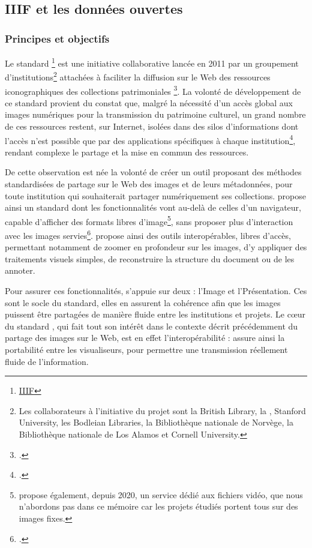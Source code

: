 
\subsection{IIIF et les données ouvertes}
    \subsubsection{Principes et objectifs}
Le standard \iiif\footnote{\href{https://iiif.io/}{IIIF}} est une initiative collaborative lancée en 2011 par un groupement d'institutions\footnote{Les collaborateurs à l'initiative du projet sont la British Library, la \bnf, Stanford University, les Bodleian Libraries, la Bibliothèque nationale de Norvège, la Bibliothèque nationale de Los Alamos et Cornell University.} attachées à faciliter la diffusion sur le Web des ressources iconographiques des collections patrimoniales \footcite{cramerInternationalImageInteroperability2011}. La volonté de développement de ce standard provient du constat que, malgré la nécessité d'un accès global aux images numériques pour la transmission du patrimoine culturel, un grand nombre de ces ressources restent, sur Internet, isolées dans des silos d'informations dont l'accès n'est possible que par des applications spécifiques à chaque institution\footcite{cramerInternationalImageInteroperability2011}, rendant complexe le partage et la mise en commun des ressources.

De cette observation est née la volonté de créer un outil proposant des méthodes standardisées de partage sur le Web des images et de leurs métadonnées, pour toute institution qui souhaiterait partager numériquement ses collections. \iiif propose ainsi un standard dont les fonctionnalités vont au-delà de celles d'un navigateur, capable d'afficher des formats libres d'image\footnote{\iiif propose également, depuis 2020, un service dédié aux fichiers vidéo, que nous n'abordons pas dans ce mémoire car les projets étudiés portent tous sur des images fixes.}, sans proposer plus d'interaction avec les images servies\footcite{HowItWorks}. \iiif propose ainsi des outils interopérables, libres d'accès, permettant notamment de zoomer en profondeur sur les images, d'y appliquer des traitements visuels simples, de reconstruire la structure du document ou de les annoter.

Pour assurer ces fonctionnalités, \iiif s'appuie sur deux \api : l'\api Image et l'\api Présentation. Ces \api sont le socle du standard, elles en assurent la cohérence afin que les images puissent être partagées de manière fluide entre les institutions et projets. Le cœur du standard \iiif, qui fait tout son intérêt dans le contexte décrit précédemment du partage des images sur le Web, est en effet l'interopérabilité : \iiif assure ainsi la portabilité entre les visualiseurs, pour permettre une transmission réellement fluide de l'information.
    
